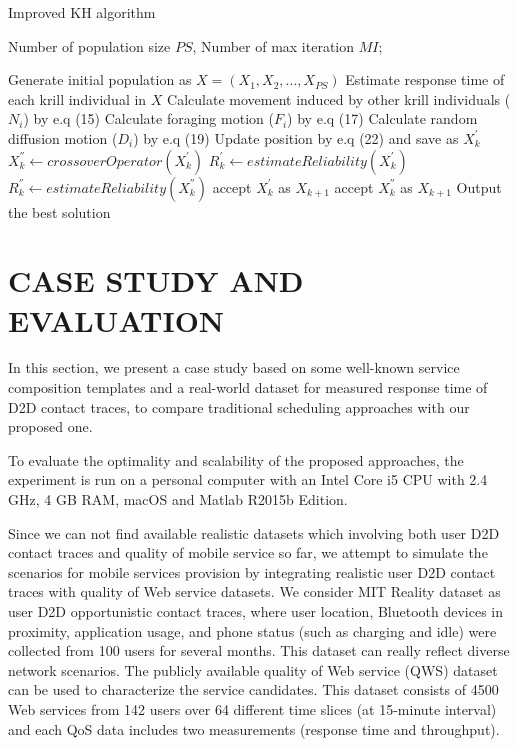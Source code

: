 \documentclass[journal]{IEEEtran}
\begin{document}
\begin{algorithm}
\caption{Improved KH algorithm}
\label{alg2}
\begin{algorithmic}[1]

\REQUIRE Number of population size $PS$, Number of max iteration $MI$;

\STATE Generate initial population as $X = (X_1, X_2, ..., X_{PS})$
\STATE Estimate response time of each krill individual in $X$
    \STATE Calculate movement induced by other krill individuals ($N_i$) by e.q (15)
    \STATE Calculate foraging motion ($F_i$) by e.q (17)
    \STATE Calculate random diffusion motion ($D_i$) by e.q (19)
    \STATE Update position by e.q (22) and save as $X_k^{'}$
    \STATE $X_k^{''} \leftarrow crossoverOperator(X_k^{'})$
    \STATE $R_k^{'} \leftarrow estimateReliability(X_k^{'})$
    \STATE $R_k^{''} \leftarrow estimateReliability(X_k^{''})$
      \STATE accept $X_k^{'}$ as $X_{k+1}$
    \ELSE
      \STATE accept $X_k^{''}$ as $X_{k+1}$
    \ENDIF
  \ENDFOR
\ENDFOR
\STATE Output the best solution
\end{algorithmic}
\end{algorithm}



\section{CASE STUDY AND EVALUATION}
In this section, we present a case study based on some well-known service composition templates and a real-world dataset for measured response time of D2D contact traces, to compare traditional scheduling approaches with our proposed one.

To evaluate the optimality and scalability of the proposed approaches, the experiment is run on a personal computer with an Intel Core i5 CPU with 2.4 GHz, 4 GB RAM, macOS and Matlab R2015b Edition.

Since we can not find available realistic datasets which involving both user D2D contact traces and quality of mobile service so far, we attempt to simulate the scenarios for mobile services provision by integrating realistic user D2D contact traces with quality of Web service datasets. 
We consider MIT Reality dataset \cite{eagle2006reality} as user D2D opportunistic contact traces, where user location, Bluetooth devices in proximity, application usage, and phone status (such as charging and idle) were collected from 100 users for several months. This dataset can really reflect diverse network scenarios.
The publicly available quality of Web service (QWS) dataset\cite{zheng2014investigating} can be used to characterize the service candidates. This dataset consists of 4500 Web services from 142 users over 64 different time slices (at 15-minute interval) and each QoS data includes two measurements (response time and throughput).
\end{document}

